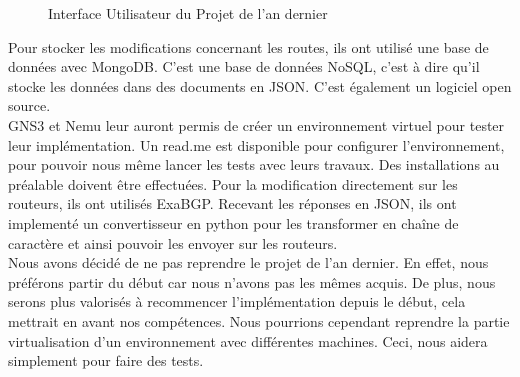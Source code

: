 \begin{figure}[H]
\caption{Interface Utilisateur du Projet de l'an dernier}
\end{figure}

Pour stocker les modifications concernant les routes, ils ont utilisé une base de données avec MongoDB. C'est une base de données NoSQL, c'est à dire qu'il stocke les données dans des documents en JSON. C'est également un logiciel open source.
\\ \indent
GNS3 et Nemu leur auront permis de créer un environnement virtuel pour tester leur implémentation. Un read.me est disponible pour configurer l'environnement, pour pouvoir nous même lancer les tests avec leurs travaux. Des installations au préalable doivent être effectuées.
Pour la modification directement sur les routeurs, ils ont utilisés ExaBGP. Recevant les réponses en JSON, ils ont implementé un convertisseur en python pour les transformer en chaîne de caractère et ainsi pouvoir les envoyer sur les routeurs. \\ \indent
Nous avons décidé de ne pas reprendre le projet de l'an dernier. En effet, nous préférons partir du début car nous n'avons pas les mêmes acquis. De plus, nous serons plus valorisés à recommencer l'implémentation depuis le début, cela mettrait en avant nos compétences. Nous pourrions cependant reprendre la partie virtualisation d'un environnement avec différentes machines. Ceci, nous aidera simplement pour faire des tests.